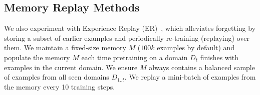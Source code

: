 
\vspace{-0.1cm}
\subsection{Memory Replay Methods}
\label{ssec:mem_replay_methods}
\vspace{-0.1cm}
We also experiment with Experience Replay (ER)~\cite{chaudhry2019tiny}, which alleviates forgetting by storing a subset of earlier examples and periodically re-training (replaying) over them. We maintain a fixed-size memory $M$ ($100k$ examples by default) and populate the memory $M$ each time pretraining on a domain $D_t$ finishes with examples in the current domain. We ensure $M$ always contains a balanced sample of examples from all seen domains $D_{1..{t}}$. We replay a mini-batch of examples from the memory every 10 training steps.


